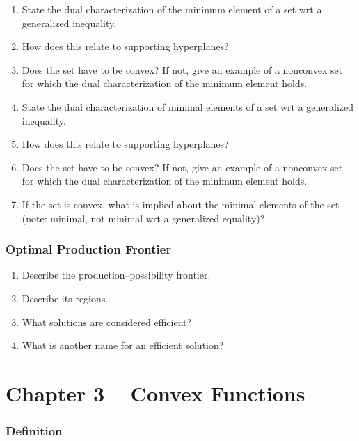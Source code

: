 \documentclass[]{article}
\newcounter{q}
\begin{document}
\begin{enumerate}[resume*]
\item State the dual characterization of the minimum element of a set wrt a generalized inequality.
\item How does this relate to supporting hyperplanes?
\item Does the set have to be convex? If not, give an example of a nonconvex set for which the dual characterization of the minimum element holds.
\item State the dual characterization of minimal elements of a set wrt a generalized inequality.
\item How does this relate to supporting hyperplanes?
\item Does the set have to be convex? If not, give an example of a nonconvex set for which the dual characterization of the minimum element holds.
\item If the set is convex, what is implied about the minimal elements of the set (note: minimal, not minimal wrt a generalized equality)?
\end{enumerate}

\subsubsection*{Optimal Production Frontier}

\begin{enumerate}[resume*]
\item Describe the production--possibility frontier.
\item Describe its regions.
\item What solutions are considered efficient?
\item What is another name for an efficient solution?\\
\end{enumerate}

\section*{Chapter 3 -- Convex Functions}

\subsubsection*{Definition}
\end{document}
